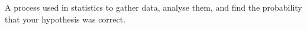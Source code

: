A process used in statistics to gather data, analyse them, and
find the probability that your hypothesis was correct.